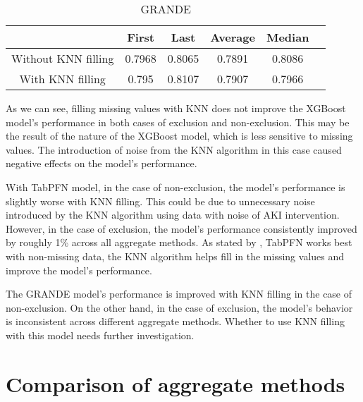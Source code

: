 \documentclass[../main.tex]{subfiles}
\begin{document}
\begin{table}[H]
    \begin{subtable}{\textwidth}
        \centering
        \caption{GRANDE}

        \begin{tabular}{|c|c|c|c|c|c|}
            \hline
            \textbf{} & 
            \textbf{First} & 
            \textbf{Last} & 
            \textbf{Average} &
            \textbf{Median} \\
            \hline

            Without KNN filling & 
            0.7968 & 
            0.8065 & 
            0.7891 &
            0.8086 \\

            With KNN filling & 
            0.795 & 
            0.8107 & 
            0.7907 &
            0.7966 \\

            \hline
        \end{tabular}
    \end{subtable}

\end{table}

As we can see, filling missing values with KNN does not improve the XGBoost model's performance in both cases of exclusion and non-exclusion.
This may be the result of the nature of the XGBoost model, which is less sensitive to missing values.
The introduction of noise from the KNN algorithm in this case caused negative effects on the model's performance.

With TabPFN model, in the case of non-exclusion, the model's performance is slightly worse with KNN filling.
This could be due to unnecessary noise introduced by the KNN algorithm using data with noise of AKI intervention.
However, in the case of exclusion, the model's performance consistently improved by roughly 1\% across all aggregate methods.
As stated by \citeauthor{tabpfn}, TabPFN works best with non-missing data, the KNN algorithm helps fill in the missing values and improve the model's performance.

The GRANDE model's performance is improved with KNN filling in the case of non-exclusion.
On the other hand, in the case of exclusion, the model's behavior is inconsistent across different aggregate methods.
Whether to use KNN filling with this model needs further investigation.


\section{Comparison of aggregate methods}
\label{sec:aggregate_methods}
\end{document}
